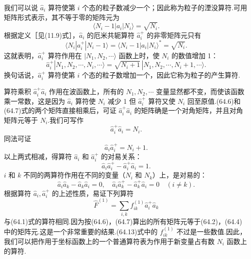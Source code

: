 我们可以说 $\hat{a}_i$ 算符使第 $i$ 个态的粒子数减少一个；因此称为粒子的湮没算符.可用矩阵形式表示，其不等于零的矩阵元为
\begin{equation}
  \langle N_i-1|a_i|N_i\rangle=\sqrt{N_i}.
\end{equation}
根据定义［见(11.9)式］，$\hat{a}_i$ 的厄米共轭算符 $\hat{a}_i^{+}$ 的非零矩阵元只有
\begin{equation}
  \langle N_i|a_i^{+}|N_i-1\rangle=\langle N_i-1|a_i|N_i\rangle^{*}=\sqrt{N_i}.
\end{equation}
这就表明，$\hat{a}_i^{+}$ 算符作用在 $|N_1,N_2,\cdots\rangle$ 函数上时，使 $N_i$ 的数值增加 1：
\begin{equation}
  \hat{a}_i^{+}|N_1,N_2,\cdots,N_i,\cdots\rangle=\sqrt{N_i+1}\,|N_1,N_2,\cdots,N_i+1,\cdots\rangle.
\end{equation}
换句话说，$\hat{a}_i^{+}$ 算符使第 $i$ 个态的粒子数增加一个，因此它称为粒子的产生算符.

算符乘积 $\hat{a}_i^{+}\hat{a}_i$ 作用在波函数上，所有的 $N_1,N_2,\cdots$ 变量显然都不变，而使该函数乘一常数，这是因为 $\hat{a}_i$ 算符使 $N_i$ 减少 1 但 $\hat{a}_i^{+}$ 算符又使 $N_i$ 回至原值.(64.6)和(64.7)式的两个矩阵直接相乘后，可证 $\hat{a}_i^{+}\hat{a}_i$ 的矩阵确是一个对角矩阵，并且对角矩阵元等于 $N_i$.我们可写作
\begin{equation}
  \hat{a}_i^{+}\hat{a}_i=N_i.
\end{equation}
同法可证
\begin{equation}
  \hat{a}_i\hat{a}_i^{+}=N_i+1.
\end{equation}
以上两式相减，得算符 $\hat{a}_i$ 和 $\hat{a}_i^{+}$ 的对易关系：
\begin{equation}
  \hat{a}_i\hat{a}_i^{+}-\hat{a}_i^{+}\hat{a}_i=1.
\end{equation}
$i$ 和 $k$ 不同的两算符作用在不同的变量（$N_i$ 和 $N_k$）上，是对易的：
\begin{equation}
  \hat{a}_i\hat{a}_k-\hat{a}_k\hat{a}_i=0,\quad
  \hat{a}_i\hat{a}_k^{+}-\hat{a}_k^{+}\hat{a}_i=0\quad(i\neq k).
\end{equation}
根据算符 $\hat{a}_i,\hat{a}_i^{+}$ 的上述性质，易证下列算符
\begin{equation}
  \hat{F}^{(1)}=\sum_{i,k}f_{ik}^{(1)}\hat{a}_i^{+}\hat{a}_k
\end{equation}
与(64.1)式的算符相同.因为按(64.6)，(64.7)算出的所有矩阵元等于(64.2)，(64.4)中的矩阵元.这是一个非常重要的结果.(64.13)式中的 $f_{ik}^{(1)}$ 不过是一些数值.因此，我们可以把作用于坐标函数上的一个普通算符表为作用于新变量占有数 $N_i$ 函数上的算符.

